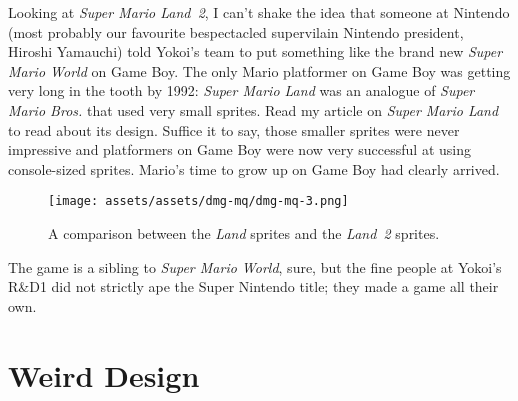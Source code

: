 \documentclass{book}
\begin{document}
Looking at \emph{Super Mario Land 2}, I can’t shake the idea that someone at Nintendo (most probably our favourite bespectacled supervilain Nintendo president, Hiroshi Yamauchi) told Yokoi’s team to put something like the brand new \emph{Super Mario World} on Game Boy. The only Mario platformer on Game Boy was getting very long in the tooth by 1992: \emph{Super Mario Land} was an analogue of \emph{Super Mario Bros.} that used very small sprites. Read my article on \emph{Super Mario Land} to read about its design. Suffice it to say, those smaller sprites were never impressive and platformers on Game Boy were now very successful at using console-sized sprites. Mario’s time to grow up on Game Boy had clearly arrived.

\begin{figure}[hbt]
\vskip 10pt
\centering \texttt{[image: assets/assets/dmg-mq/dmg-mq-3.png]}\par\pagetwodescription A comparison between the \emph{Land} sprites and the \emph{Land 2} sprites.
\vskip 6pt
\end{figure}

The game is a sibling to \emph{Super Mario World}, sure, but the fine people at Yokoi’s R\&D1 did not strictly ape the Super Nintendo title; they made a game all their own.

\FloatBarrier\needspace{5pt}\section*{Weird Design}\nopagebreak[4]
\end{document}
